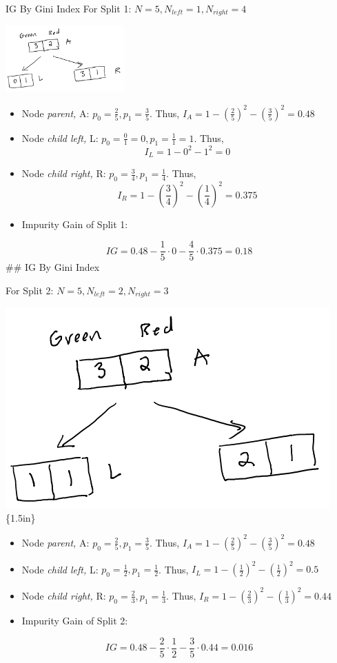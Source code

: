 \documentclass[
  ignorenonframetext,
]{beamer}
\begin{document}
\begin{frame}{IG By Gini Index}
\label{ig-by-gini-index}
For Split 1: \(N = 5, N_{left} =1, N_{right} = 4\)

\includegraphics[width=\textwidth,height=1in]{images/im1.png}

\begin{itemize}
\item
  Node \emph{parent,} A: \(p_0 = \frac{2}{5}, p_1 = \frac{3}{5}\). Thus,
  \(I_{A} = 1 - (\frac{2}{5})^2-(\frac{3}{5})^2 = 0.48\)
\item
  Node \emph{child left,} L:
  \(p_0 = \frac{0}{1} = 0, p_1 = \frac{1}{1} = 1\). Thus,
  \[I_{L} = 1 -0^2-1^2 = 0\]
\item
  Node \emph{child right,} R: \(p_0 = \frac{3}{4}, p_1 = \frac{1}{4}\).
  Thus, \[I_{R} = 1-(\frac{3}{4})^2-(\frac{1}{4})^2 = 0.375\]
\item
  Impurity Gain of Split 1:
\end{itemize}

\[IG = 0.48 - \frac{1}{5} \cdot 0-\frac{4}{5} \cdot 0.375 = 0.18\] \#\#
IG By Gini Index

For Split 2: \(N = 5, N_{left} =2, N_{right} = 3\)

\includegraphics{images/im3.png}\{1.5in\}

\begin{itemize}
\item
  Node \emph{parent,} A: \(p_0 = \frac{2}{5}, p_1 = \frac{3}{5}\). Thus,
  \(I_{A} = 1-(\frac{2}{5})^2- (\frac{3}{5})^2 = 0.48\)
\item
  Node \emph{child left,} L: \(p_0 = \frac{1}{2}, p_1 = \frac{1}{2}\).
  Thus, \(I_{L} = 1- (\frac{1}{2})^2-(\frac{1}{2})^2=0.5\)
\item
  Node \emph{child right,} R: \(p_0 = \frac{2}{3}, p_1 = \frac{1}{3}\).
  Thus, \(I_{R} = 1-(\frac{2}{3})^2 -(\frac{1}{3})^2 = 0.44\)
\item
  Impurity Gain of Split 2:
\end{itemize}

\[IG = 0.48 - \frac{2}{5} \cdot \frac{1}{2}-\frac{3}{5} \cdot 0.44 = 0.016\]
\end{frame}
\end{document}
